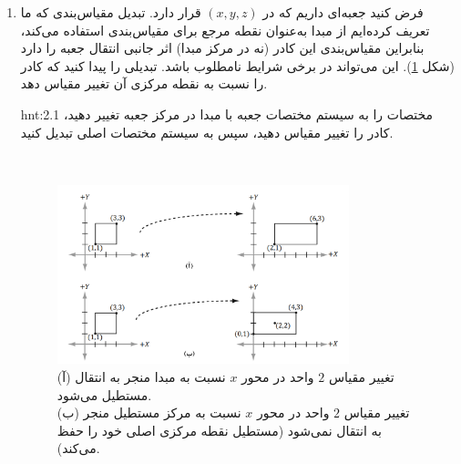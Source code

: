 {\begin{spacing}{1.5}
\begin{enumerate}[label=\textbf{\arabic*}.]
            \item {
                فرض کنید جعبه‌ای داریم که در $(x,y,z)$ قرار دارد. تبدیل مقیاس‌بندی که ما تعریف کرده‌ایم از مبدا به‌عنوان نقطه مرجع برای مقیاس‌بندی استفاده می‌کند،
                بنابراین مقیاس‌بندی این کادر (نه در مرکز مبدا) اثر جانبی انتقال جعبه را دارد (شکل \ref{fig:4.Session.1.3.18}).
                این می‌تواند در برخی شرایط نامطلوب باشد. تبدیلی را پیدا کنید که کادر را نسبت به نقطه مرکزی آن تغییر مقیاس دهد.

                \begin{hint}{hnt:2.1}
                    \Large
                    مختصات را به سیستم مختصات جعبه با مبدا در مرکز جعبه تغییر دهید، کادر را تغییر مقیاس دهید، سپس به سیستم مختصات اصلی تبدیل کنید.
                \end{hint} \\

                \begin{figure}[H]
                    \centering
                    \setlength{\belowcaptionskip}{-10pt}
                    \includegraphics[width=0.8\textwidth]{Images/4/3/4.Session.1.3.18}
                    \caption {(آ) تغییر مقیاس $2$ واحد در محور $x$ نسبت به مبدا منجر به انتقال مستطیل می‌شود.
                        \\(ب) تغییر مقیاس $2$ واحد در محور $x$ نسبت به مرکز مستطیل منجر به انتقال نمی‌شود (مستطیل نقطه مرکزی اصلی خود را حفظ می‌کند).}
                    \label{fig:4.Session.1.3.18}
                \end{figure}
            }
        \end{enumerate}
    \end{spacing}
}